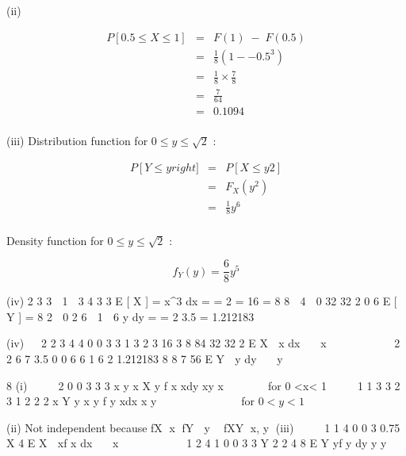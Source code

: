 \documentclass[a4paper,12pt]{article}
\begin{document}
(ii) 

\begin{eqnarray*}
P [ 0.5 \leq  X \leq  1 ] &=& F ( 1 ) \; - \; F ( 0.5 ) \\
&=& \frac{1}{8} \left( 1 - -0.5^3 \right)\\
&=& \frac{1}{8} \times \frac{7}{8} \\
&=& \frac{7}{64}\\
&=& 0.1094 \\
\end{eqnarray*}


(iii) Distribution function for $0 \leq y \leq \sqrt{2}$ :

\begin{eqnarray*}
P \left[ Y \leq y right] 
&=& P \left[ X \leq y 2 \right] \\ 
&=& F_X(y^2) \\ 
&=& \frac{1}{8} y^6 \\
\end{eqnarray*}

Density function for $0 \leq y \leq \sqrt{2}$ :


\[f_Y ( y ) = \frac{6}{8} y^5 \]

(iv)
2
3
3  1 
3 4 3
3
E [ X ] = \int x^3 dx = \left[x 4 \right] =
2 = 16 =
8
8  4  0 32
32
2
0
6
E [ Y ] =
8
2

0
2
6  1 
6
y dy = \left[y 7 \right] = 2 3.5 = 1.212183

\item (iv)  
  2 2
  3 4 4
  0 0
  3 3 1 3 2 3 16 3
  8 84 32 32 2
  E X  x dx   x       
   
  2 2
  6 7 3.5
  0 0
  6 6 1 6 2 1.212183
  8 8 7 56
  E Y  y dy   y      
  \item 8 (i)     2
  0
  0
  3 3 3
  x
  y x
  X y f x xdy xy x 
       for 0 <x< 1
      1 1
  3 3 2 3 1 2
  2 2
  x
  Y
  y x y
  f y xdx x y
  
  
           for $0 <y< 1$
 \item  (ii) Not independent because fX x fY  y  fXY x, y
  (iii)    
  1 1
  4
  0 0
  3 0.75
  X 4 E X  xf x dx   x     
     
  1 2 4 1
  0 0
  3 3
  Y 2 2 4 8
  E Y yf y dy y y
    
           
  
\end{document}
